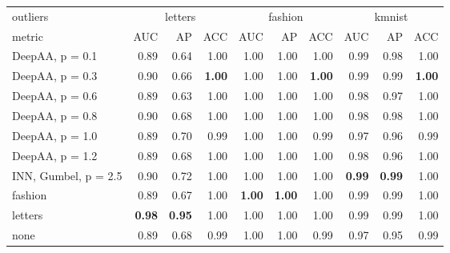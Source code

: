 \begin{tabular}{lrrrrrrrrr}
\toprule
{outliers} & \multicolumn{3}{c}{letters} & \multicolumn{3}{c}{fashion} & \multicolumn{3}{c}{kmnist} \\
{metric} & {AUC} & {AP} & {ACC} & {AUC} & {AP} & {ACC} & {AUC} & {AP} & {ACC} \\
\midrule
DeepAA, p = 0.1 & 0.89 & 0.64 & 1.00 & 1.00 & 1.00 & 1.00 & 0.99 & 0.98 & 1.00 \\
DeepAA, p = 0.3 & 0.90 & 0.66 & \bfseries 1.00 & 1.00 & 1.00 & \bfseries 1.00 & 0.99 & 0.99 & \bfseries 1.00 \\
DeepAA, p = 0.6 & 0.89 & 0.63 & 1.00 & 1.00 & 1.00 & 1.00 & 0.98 & 0.97 & 1.00 \\
DeepAA, p = 0.8 & 0.90 & 0.68 & 1.00 & 1.00 & 1.00 & 1.00 & 0.98 & 0.98 & 1.00 \\
DeepAA, p = 1.0 & 0.89 & 0.70 & 0.99 & 1.00 & 1.00 & 0.99 & 0.97 & 0.96 & 0.99 \\
DeepAA, p = 1.2 & 0.89 & 0.68 & 1.00 & 1.00 & 1.00 & 1.00 & 0.98 & 0.96 & 1.00 \\
INN, Gumbel, p = 2.5 & 0.90 & 0.72 & 1.00 & 1.00 & 1.00 & 1.00 & \bfseries 0.99 & \bfseries 0.99 & 1.00 \\
fashion & 0.89 & 0.67 & 1.00 & \bfseries 1.00 & \bfseries 1.00 & 1.00 & 0.99 & 0.99 & 1.00 \\
letters & \bfseries 0.98 & \bfseries 0.95 & 1.00 & 1.00 & 1.00 & 1.00 & 0.99 & 0.99 & 1.00 \\
none & 0.89 & 0.68 & 0.99 & 1.00 & 1.00 & 0.99 & 0.97 & 0.95 & 0.99 \\
\bottomrule
\end{tabular}
